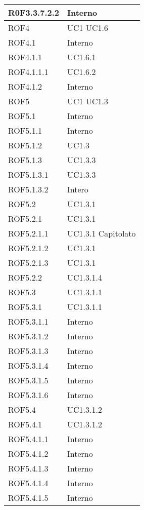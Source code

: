 \begin{center}
\begin{longtable}{| p{4cm} | p{4cm} |}
\hline
R0F3.3.7.2.2   &  Interno \\
\hline
ROF4   &  UC1 \newline UC1.6 \\
\hline
ROF4.1   &  Interno \\
\hline
ROF4.1.1   &  UC1.6.1 \\
\hline
ROF4.1.1.1   &  UC1.6.2 \\
\hline
ROF4.1.2   &  Interno \\
\hline
ROF5   &  UC1 \newline UC1.3 \\
\hline
ROF5.1   &  Interno \\
\hline
ROF5.1.1   &  Interno \\
\hline
ROF5.1.2   &  UC1.3 \\
\hline
ROF5.1.3   &  UC1.3.3 \\
\hline
ROF5.1.3.1   &  UC1.3.3 \\
\hline
ROF5.1.3.2   &  Intero \\
\hline
ROF5.2   &  UC1.3.1 \\
\hline
ROF5.2.1   &  UC1.3.1 \\
\hline
ROF5.2.1.1   &  UC1.3.1 \newline Capitolato \\
\hline
ROF5.2.1.2   &  UC1.3.1 \\
\hline
ROF5.2.1.3   &  UC1.3.1 \\
\hline
ROF5.2.2   &  UC1.3.1.4  \\
\hline
ROF5.3   &  UC1.3.1.1 \\
\hline
ROF5.3.1   &  UC1.3.1.1  \\
\hline
ROF5.3.1.1   &  Interno \\
\hline
ROF5.3.1.2   &  Interno \\
\hline
ROF5.3.1.3   &  Interno \\
\hline
ROF5.3.1.4   &  Interno \\
\hline
ROF5.3.1.5   &  Interno \\
\hline
ROF5.3.1.6   &  Interno \\
\hline
ROF5.4   &  UC1.3.1.2  \\
\hline
ROF5.4.1   &  UC1.3.1.2  \\
\hline
ROF5.4.1.1   &  Interno \\
\hline
ROF5.4.1.2   &  Interno \\
\hline
ROF5.4.1.3   &  Interno \\
\hline
ROF5.4.1.4   &  Interno \\
\hline
ROF5.4.1.5   &  Interno \\

\end{longtable}
\end{center}
